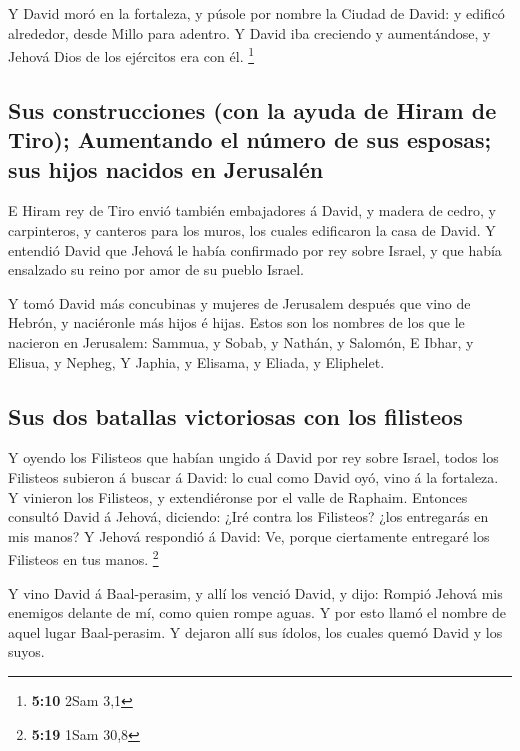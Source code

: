  Y David moró en la fortaleza, y púsole por nombre la Ciudad
de David: y edificó alrededor, desde Millo para adentro.  Y
David iba creciendo y aumentándose, y Jehová Dios de los ejércitos era
con él. \footnote{\textbf{5:10} 2Sam 3,1}

\hypertarget{sus-construcciones-con-la-ayuda-de-hiram-de-tiro-aumentando-el-nuxfamero-de-sus-esposas-sus-hijos-nacidos-en-jerusaluxe9n}{%
\subsection{Sus construcciones (con la ayuda de Hiram de Tiro);
Aumentando el número de sus esposas; sus hijos nacidos en
Jerusalén}\label{sus-construcciones-con-la-ayuda-de-hiram-de-tiro-aumentando-el-nuxfamero-de-sus-esposas-sus-hijos-nacidos-en-jerusaluxe9n}}

 E Hiram rey de Tiro envió también embajadores á David, y
madera de cedro, y carpinteros, y canteros para los muros, los cuales
edificaron la casa de David.  Y entendió David que Jehová
le había confirmado por rey sobre Israel, y que había ensalzado su reino
por amor de su pueblo Israel.

 Y tomó David más concubinas y mujeres de Jerusalem después
que vino de Hebrón, y naciéronle más hijos é hijas.  Estos
son los nombres de los que le nacieron en Jerusalem: Sammua, y Sobab, y
Nathán, y Salomón,  E Ibhar, y Elisua, y Nepheg,
 Y Japhia, y Elisama, y Eliada, y Eliphelet.

\hypertarget{sus-dos-batallas-victoriosas-con-los-filisteos}{%
\subsection{Sus dos batallas victoriosas con los
filisteos}\label{sus-dos-batallas-victoriosas-con-los-filisteos}}

 Y oyendo los Filisteos que habían ungido á David por rey
sobre Israel, todos los Filisteos subieron á buscar á David: lo cual
como David oyó, vino á la fortaleza.  Y vinieron los
Filisteos, y extendiéronse por el valle de Raphaim. 
Entonces consultó David á Jehová, diciendo: ¿Iré contra los Filisteos?
¿los entregarás en mis manos? Y Jehová respondió á David: Ve, porque
ciertamente entregaré los Filisteos en tus manos. \footnote{\textbf{5:19}
  1Sam 30,8}

 Y vino David á Baal-perasim, y allí los venció David, y
dijo: Rompió Jehová mis enemigos delante de mí, como quien rompe aguas.
Y por esto llamó el nombre de aquel lugar Baal-perasim.  Y
dejaron allí sus ídolos, los cuales quemó David y los suyos.

